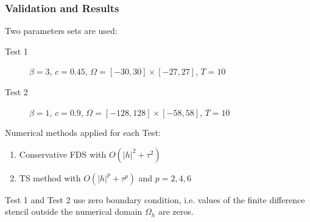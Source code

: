 \documentclass{beamer}
\begin{document}

\begin{frame}
\frametitle{Validation and Results}
Two parameters sets are used:
\begin{description}
 \item[Test 1] $\beta = 3$, $c = 0.45$, $\Omega = [-30, 30] \times [-27, 27]$, $T = 10$
 \item[Test 2] $\beta = 1$, $c = 0.9$, $\Omega = [-128, 128] \times [-58, 58]$, $T = 10$
\end{description}

Numerical methods applied for each Test:
\begin{enumerate}
  \item Conservative FDS with $O(|h|^2 + \tau^2)$
  \item TS method with $O(|h|^p + \tau^p)$ and $p = 2, 4, 6$
\end{enumerate}

Test 1 and Test 2 use zero boundary condition, i.e. values of the finite difference stencil outside the numerical domain $\Omega_h$ are zeros.
\end{frame}

\end{document}

